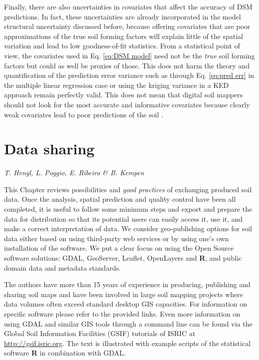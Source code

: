 \documentclass[10pt,b5paper,]{book}
\theoremstyle{definition}
\theoremstyle{definition}
\theoremstyle{definition}
\theoremstyle{remark}
\begin{document}
Finally, there are also uncertainties in covariates that affect the
accuracy of DSM predictions. In fact, these uncertainties are already
incorporated in the model structural uncertainty discussed before,
because offering covariates that are poor approximations of the true
soil forming factors will explain little of the spatial variation and
lead to low goodness-of-fit statistics. From a statistical point of
view, the covariates used in Eq. \ref{eq:DSM model} need not be the
\emph{true} soil forming factors but could as well be proxies of those.
This does not harm the theory and quantification of the prediction error
variance such as through Eq. \ref{eq:pred err} in the multiple linear
regression case or using the kriging variance in a KED approach remain
perfectly valid. This does not mean that digital soil mappers should not
look for the most accurate and informative covariates because clearly
weak covariates lead to poor predictions of the soil
\citep{samuel2015more}.

\hypertarget{data-sharing}{%
\chapter{Data sharing}\label{data-sharing}}

\emph{T. Hengl, L. Poggio, E. Ribeiro \& B. Kempen}

This Chapter reviews possibilities and \emph{good practices} of
exchanging produced soil data. Once the analysis, spatial prediction and
quality control have been all completed, it is useful to follow some
minimum steps and export and prepare the data for distribution so that
its potential users can easily access it, use it, and make a correct
interpretation of data. We consider geo-publishing options for soil data
either based on using third-party web services or by using one's own
installation of the software. We put a clear focus on using the Open
Source software solutions: GDAL, GeoServer, Leaflet, OpenLayers and
\textbf{R}, and public domain data and metadata standards.

The authors have more than 15 years of experience in producing,
publishing and sharing soil maps and have been involved in large soil
mapping projects where data volumes often exceed standard desktop GIS
capacities. For information on specific software please refer to the
provided links. Even more information on using GDAL and similar GIS
tools through a command line can be found via the Global Soil
Information Facilities (GSIF) tutorials of ISRIC at
\url{http://gsif.isric.org}. The text is illustrated with example
scripts of the statistical software \textbf{R} in combination with GDAL.
\end{document}
